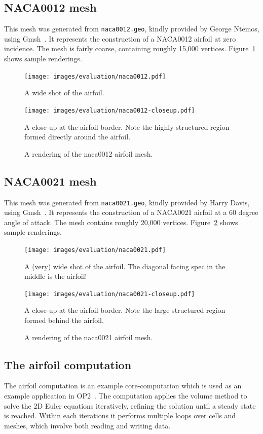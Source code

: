 \subsection{NACA0012 mesh}
This mesh was generated from \texttt{naca0012.geo}, kindly provided by George Ntemos, using Gmsh~\cite{geuzaine2008gmsh}. It represents the construction of a NACA0012 airfoil at zero incidence. The mesh is fairly coarse, containing roughly 15,000 vertices. Figure~\ref{fig:naca0012-mesh} shows sample renderings.

\begin{figure}
\sidebysidevertical
{
  \texttt{[image: images/evaluation/naca0012.pdf]}
  \caption{A wide shot of the airfoil.}
}
{
  \texttt{[image: images/evaluation/naca0012-closeup.pdf]}
  \caption{A close-up at the airfoil border. Note the highly structured region formed directly around the airfoil.}
}
\caption{A rendering of the naca0012 airfoil mesh.}
\label{fig:naca0012-mesh}
\end{figure}

\subsection{NACA0021 mesh}
This mesh was generated from \texttt{naca0021.geo}, kindly provided by Harry Davis, using Gmsh~\cite{geuzaine2008gmsh}. It represents the construction of a NACA0021 airfoil at a 60 degree angle of attack. The mesh contains roughly 20,000 vertices. Figure~\ref{fig:naca0021-mesh} shows sample renderings.

\begin{figure}
\sidebysidevertical
{
  \texttt{[image: images/evaluation/naca0021.pdf]}
  \caption{A (very) wide shot of the airfoil. The diagonal facing spec in the middle is the airfoil!}
}
{
  \texttt{[image: images/evaluation/naca0021-closeup.pdf]}
  \caption{A close-up at the airfoil border. Note the large structured region formed behind the airfoil.}
}
\caption{A rendering of the naca0021 airfoil mesh.}
\label{fig:naca0021-mesh}
\end{figure}


\subsection{The airfoil computation}
\label{subsec:airfoil-computation}
The airfoil computation is an example core-computation which is used as an example application in OP2~\cite{op2airfoil}. The computation applies the volume method to solve the 2D Euler equations iteratively, refining the solution until a steady state is reached. Within each iterations it performs multiple loops over cells and meshes, which involve both reading and writing data.

